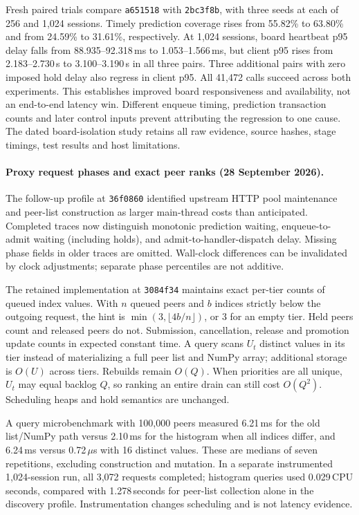 Fresh paired trials compare \texttt{a651518} with \texttt{2bc3f8b}, with three
seeds at each of 256 and 1,024 sessions. Timely prediction coverage rises from
55.82\% to 63.80\% and from 24.59\% to 31.61\%, respectively. At 1,024 sessions,
board heartbeat p95 delay falls from 88.935--92.318\,ms to 1.053--1.566\,ms,
but client p95 rises from 2.183--2.730\,s to 3.100--3.190\,s in all three pairs.
Three additional pairs with zero imposed hold delay also regress in client p95.
All 41,472 calls succeed across both experiments. This establishes improved
board responsiveness and availability, not an end-to-end latency win. Different
enqueue timing, prediction transaction counts and later control inputs prevent
attributing the regression to one cause. The dated board-isolation study retains
all raw evidence, source hashes, stage timings, test results and host limitations.


\paragraph{Proxy request phases and exact peer ranks (28 September 2026).}
The follow-up profile at \texttt{36f0860} identified upstream HTTP pool maintenance
and peer-list construction as larger main-thread costs than anticipated.
Completed traces now distinguish monotonic prediction waiting, enqueue-to-admit
waiting (including holds), and admit-to-handler-dispatch delay. Missing phase
fields in older traces are omitted. Wall-clock differences can be invalidated
by clock adjustments; separate phase percentiles are not additive.

The retained implementation at \texttt{3084f34} maintains exact per-tier counts
of queued index values. With $n$ queued peers and $b$ indices strictly below the
outgoing request, the hint is $\min(3,\lfloor 4b/n\rfloor)$, or 3 for an empty
tier. Held peers count and released peers do not. Submission, cancellation,
release and promotion update counts in expected constant time. A query scans
$U_t$ distinct values in its tier instead of materializing a full peer list and
NumPy array; additional storage is $O(U)$ across tiers. Rebuilds remain $O(Q)$.
When priorities are all unique, $U_t$ may equal backlog $Q$, so ranking an entire
drain can still cost $O(Q^2)$. Scheduling heaps and hold semantics are unchanged.

A query microbenchmark with 100,000 peers measured 6.21\,ms for the old list/NumPy
path versus 2.10\,ms for the histogram when all indices differ, and 6.24\,ms versus
0.72\,$\mu$s with 16 distinct values. These are medians of seven repetitions,
excluding construction and mutation. In a separate instrumented 1,024-session
run, all 3,072 requests completed; histogram queries used 0.029\,CPU seconds,
compared with 1.278\,seconds for peer-list collection alone in the discovery
profile. Instrumentation changes scheduling and is not latency evidence.

